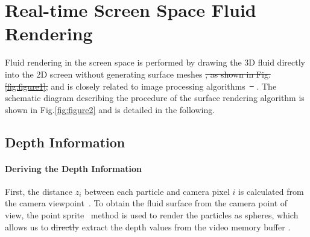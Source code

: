 \documentclass[times,twocolumn,final]{elsarticle}
\providecommand{\DIFaddtex}[1]{{\protect\color{blue}\uwave{#1}}} %
\providecommand{\DIFdeltex}[1]{{\protect\color{red}\sout{#1}}}                      %
\providecommand{\DIFaddbegin}{} %
\providecommand{\DIFaddend}{} %
\providecommand{\DIFdelbegin}{} %
\providecommand{\DIFdelend}{} %
\providecommand{\DIFadd}[1]{\texorpdfstring{\DIFaddtex{#1}}{#1}} %
\providecommand{\DIFdel}[1]{\texorpdfstring{\DIFdeltex{#1}}{}} %
\begin{document}
\DIFdelend \section{Real-time Screen Space Fluid Rendering}
Fluid rendering in the screen space is performed by drawing the 3D fluid directly into the 2D screen without generating surface meshes \DIFdelbegin \DIFdel{, as shown in Fig.\ref{fig:figure1}, }\DIFdelend and is closely related to image processing algorithms~\DIFdelbegin \DIFdel{\mbox{%
\cite{ref:green2010screen}}\hspace{0pt}%
}\DIFdelend \DIFaddbegin \DIFadd{\mbox{%
\cite{ref:ref3}}\hspace{0pt}%
}\DIFaddend . The schematic diagram describing the procedure of the surface rendering algorithm is shown in Fig.\ref{fig:figure2} and is detailed in the following.

\subsection{Depth Information}

\paragraph{Deriving the Depth Information}
First, the distance $z_i$ between each particle and camera pixel $i$ is calculated from the camera viewpoint~\cite{ref:ref20}.
To obtain the fluid surface from the camera point of view, the point sprite~\cite{ref:ref21} method is used to render the particles as spheres, which allows us to \DIFdelbegin \DIFdel{directly }\DIFdelend extract the depth values from the video memory buffer \DIFaddbegin \DIFadd{directly}\DIFaddend .
\end{document}
